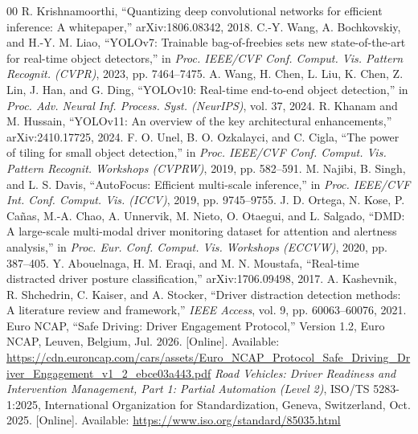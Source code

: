 \documentclass[conference]{IEEEtran}
\begin{document}
\begin{thebibliography}{00}
 R. Krishnamoorthi, ``Quantizing deep convolutional networks for efficient inference: A whitepaper,'' arXiv:1806.08342, 2018.
 C.-Y. Wang, A. Bochkovskiy, and H.-Y. M. Liao, ``YOLOv7: Trainable bag-of-freebies sets new state-of-the-art for real-time object detectors,'' in \emph{Proc. IEEE/CVF Conf. Comput. Vis. Pattern Recognit. (CVPR)}, 2023, pp. 7464--7475.
 A. Wang, H. Chen, L. Liu, K. Chen, Z. Lin, J. Han, and G. Ding, ``YOLOv10: Real-time end-to-end object detection,'' in \emph{Proc. Adv. Neural Inf. Process. Syst. (NeurIPS)}, vol. 37, 2024.
 R. Khanam and M. Hussain, ``YOLOv11: An overview of the key architectural enhancements,'' arXiv:2410.17725, 2024.
 F. O. Unel, B. O. Ozkalayci, and C. Cigla, ``The power of tiling for small object detection,'' in \emph{Proc. IEEE/CVF Conf. Comput. Vis. Pattern Recognit. Workshops (CVPRW)}, 2019, pp. 582--591.
 M. Najibi, B. Singh, and L. S. Davis, ``AutoFocus: Efficient multi-scale inference,'' in \emph{Proc. IEEE/CVF Int. Conf. Comput. Vis. (ICCV)}, 2019, pp. 9745--9755.
 J. D. Ortega, N. Kose, P. Ca\~{n}as, M.-A. Chao, A. Unnervik, M. Nieto, O. Otaegui, and L. Salgado, ``DMD: A large-scale multi-modal driver monitoring dataset for attention and alertness analysis,'' in \emph{Proc. Eur. Conf. Comput. Vis. Workshops (ECCVW)}, 2020, pp. 387--405.
 Y. Abouelnaga, H. M. Eraqi, and M. N. Moustafa, ``Real-time distracted driver posture classification,'' arXiv:1706.09498, 2017.
 A. Kashevnik, R. Shchedrin, C. Kaiser, and A. Stocker, ``Driver distraction detection methods: A literature review and framework,'' \emph{IEEE Access}, vol. 9, pp. 60063--60076, 2021.
Euro NCAP, ``Safe Driving: Driver Engagement Protocol,'' Version 1.2, Euro NCAP, Leuven, Belgium, Jul. 2026. [Online]. Available: \url{https://cdn.euroncap.com/cars/assets/Euro_NCAP_Protocol_Safe_Driving_Driver_Engagement_v1_2_ebce03a443.pdf}
 \textit{Road Vehicles: Driver Readiness and Intervention Management, Part 1: Partial Automation (Level 2)}, ISO/TS 5283-1:2025, International Organization for Standardization, Geneva, Switzerland, Oct. 2025. [Online]. Available: \url{https://www.iso.org/standard/85035.html}

\end{thebibliography}
\end{document}
